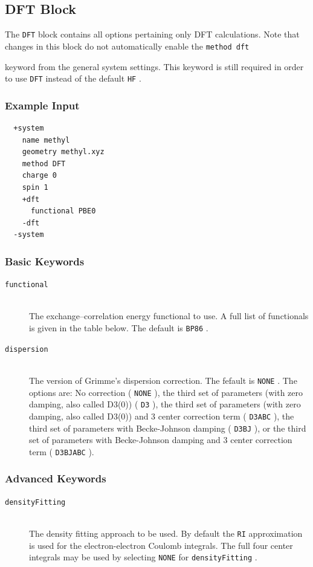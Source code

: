 \documentclass[bibliography=totocnumbered,a4paper,10pt,oneside]{scrbook}
\newcommand{\ttt}[1]{%
  \begingroup\setlength{\fboxsep}{1pt}%
  \colorbox{serenity-green!30}{\texttt{\hspace*{2pt}\vphantom{(g}#1\hspace*{2pt}}}%
  \endgroup
}
\begin{document}
\subsection{DFT Block}\label{sec:system:dft}
The \ttt{DFT} block contains all options pertaining only DFT calculations.
Note that changes in this block do not automatically enable the \ttt{method dft}
keyword from the general system settings.
This keyword is still required in order to use \ttt{DFT} instead of the default \ttt{HF}.
\subsubsection{Example Input}
\begin{lstlisting}
  +system
    name methyl 
    geometry methyl.xyz
    method DFT 
    charge 0
    spin 1
    +dft
      functional PBE0
    -dft
  -system
 \end{lstlisting}
\subsubsection{Basic Keywords}
\begin{description}
  \item [\texttt{functional}]\hfill \\
  The exchange--correlation energy functional to use. A full list of functionals is given in the table below.
  The default is \ttt{BP86}.
 \item [\texttt{dispersion}]\hfill \\
 The version of Grimme's dispersion correction. The fefault is \ttt{NONE}. The options are:
 No correction (\ttt{NONE}), the third set of parameters (with zero damping, also called D3(0)) (\ttt{D3}),
 the third set of parameters (with zero damping, also called D3(0)) and 3 center correction term (\ttt{D3ABC}),
 the third set of parameters with Becke-Johnson damping (\ttt{D3BJ}),
 or the third set of parameters with Becke-Johnson damping and 3 center correction term (\ttt{D3BJABC}).
\end{description}
\subsubsection{Advanced Keywords}
\begin{description}
    \item [\texttt{densityFitting}]\hfill \\
    The density fitting approach to be used. By default the \ttt{RI} approximation is used for the electron-electron
    Coulomb integrals. The full four center integrals may be used by selecting \ttt{NONE} for \ttt{densityFitting}.
 \end{description}
\end{document}
